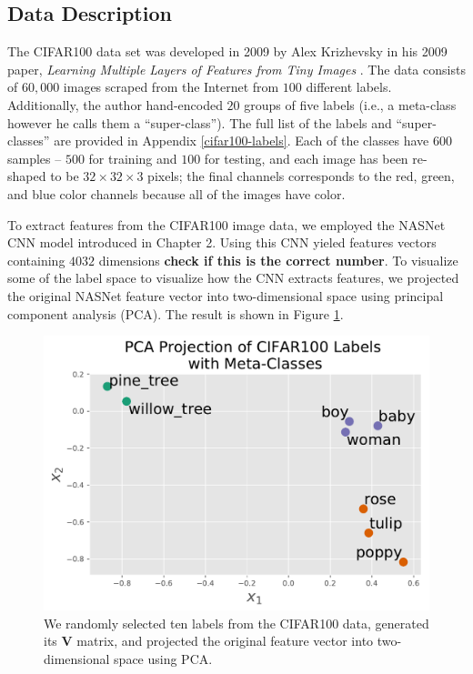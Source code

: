 \documentclass[../thesis.tex]{subfiles}
\begin{document}
\subsection{Data Description}
The CIFAR100 data set was developed in 2009 by Alex Krizhevsky in his 2009
paper, \textit{Learning Multiple Layers of Features from Tiny Images}
\cite{krizhevsky2009learning}. The data consists of $60,000$ images scraped from
the Internet from $100$ different labels. Additionally, the author hand-encoded
$20$ groups of five labels (i.e., a meta-class however he calls them a
``super-class''). The full list of the labels and ``super-classes'' are provided
in Appendix \ref{cifar100-labels}. Each of the classes have $600$ samples --
$500$ for training and $100$ for testing, and each image has been re-shaped to
be $32 \times 32 \times 3$ pixels; the final channels corresponds to the red,
green, and blue color channels because all of the images have color.

To extract features from the CIFAR100 image data, we employed the NASNet CNN
model introduced in Chapter 2. Using this CNN yieled features vectors containing
$4032$ dimensions \textbf{check if this is the correct number}. To visualize
some of the label space to visualize how the CNN extracts features, we projected
the original NASNet feature vector into two-dimensional space using principal
component analysis (PCA). The result is shown in Figure \ref{fig:cifar-pca}.
\begin{figure}
    \centering
    \includegraphics[width=\linewidth]{images/cifar-pca.pdf}
    \caption[CIFAR100 PCA Projection]{We randomly selected ten labels from the
    CIFAR100 data, generated its $\mathbf{V}$ matrix, and projected the original
    feature vector into two-dimensional space using PCA.}
    \label{fig:cifar-pca}
\end{figure}
\end{document}
